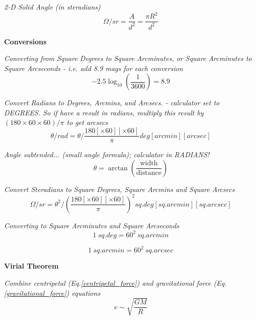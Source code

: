 \documentclass{article}
\begin{document}
\textit {2-D Solid Angle (in steradians)}
\begin{equation}
\Omega/sr = \frac {A} {d^2} = \frac {\pi R^2} {d^2}
\end{equation}

\textbf {Conversions}

\textit {Converting from Square Degrees to Square Arcminutes, or Square Arcminutes to Square Arcseconds - i.e. add 8.9 mags for each conversion}
\begin{equation}
-2.5 \log _\mathrm{10} \left( \frac {1}{3600} \right) = 8.9
\end{equation}

\textit{Convert Radians to Degrees, Arcmins, and Arcsecs. - calculator set to DEGREES. So if have a result in radians, multiply this result by \((180 \times 60 \times 60) / \pi\) to get arcsecs}
\begin{equation}
\theta/rad = \theta / \frac{180 \left[\times 60\right] \left[\times 60\right]} {\pi} deg \left[arcmin\right] \left[arcsec\right]
\end{equation}

\textit {Angle subtended... (small angle formula); calculator in RADIANS!}
\begin{equation}
\theta = \arctan\left(\frac {\mathrm{width}}{\mathrm{distance}} \right)
\end{equation}


\textit {Convert Steradians to Square Degrees, Square Arcmins and Square Arcsecs}
\begin{equation}
\Omega/sr = \theta^2 / \left( \frac{180 \left[\times 60\right] \left[\times 60\right]}{\pi} \right)^2 sq.deg \left[sq.arcmin\right] \left[sq.arcsec\right]
\end{equation}

\textit {Converting to Square Arcminutes and Square Arcseconds}
\begin{equation}
1 \: sq.deg = 60^2 \: sq.arcmin
\end{equation}

\begin{equation}
1 \: sq.arcmin = 60^2 \: sq.arcsec
\end{equation}

\textbf {Virial Theorem}

\textit {Combine centripetal (Eq.\ref{centripetal_force}) and gravitational force (Eq.\ref{gravitational_force}) equations}
\begin{equation}
v \sim \sqrt {\frac{GM}{R}}
\end{equation}
\end{document}
